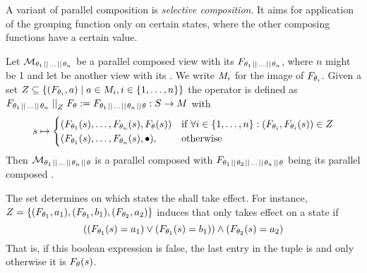 \documentclass[preview]{standalone}
\begin{document}
A variant of parallel composition is \emph{selective composition}. It aims for application of the grouping function only on certain states, where the other composing functions have a certain value.



\begin{definition}
	Let $\view[\viewppty_1 \pll \dots \pll 
	\viewppty_n]$ be a parallel composed view with its \grpfctN $\grpfct[{\viewppty_1 \pll \dots \pll \viewppty_n}]$, where $n$ might be 1 and let \view be another view with its \grpfctN \grpfct. We write $\imggrp_i$ for the image of $\grpfct[\viewppty_i]$.
	Given a set $\compselectset \subseteq \{ (\grpfct[\viewppty_i], a) \mid a \in \imggrp_i, i \in \{1, \dots, n\}\}$ the operator \compselectpure is defined as $\grpfct[{\viewppty_1 \pll \dots \pll \viewppty_n}] \compselect \grpfct := \grpfct[{\viewppty_1 \pll \dots \pll \viewppty_n} \pll \viewppty]: \states \to \arbset$ with
	\[
	\state \mapsto
	\begin{cases}
		(\grpfct[\viewppty_1](\state), \dots, \grpfct[\viewppty_n](\state),  \grpfct[\viewppty](\state))				& \text{if } \forall i \in \{1, \dots, n\} : (\grpfct[\viewppty_i], \grpfct[\viewppty_i](\state)) \in \compselectset \\ 		
		(\grpfct[\viewppty_1](\state), \dots, \grpfct[\viewppty_n](\state),  \remelem),          	& \text{otherwise}
	\end{cases}
	\]
\noindent
Then $\view[\viewppty_1 \pll \dots \pll 
\viewppty_n \pll \viewppty]$ is a parallel composed \viewN with $\grpfct[{\viewppty_1 \pll \viewppty_2 \pll \dots \pll \viewppty_n} \pll \viewppty]$ being its parallel composed \grpfctN.
\end{definition}
The set \compselectset determines on which states the \viewN \view shall take effect. For instance, $\compselectset = \{(\grpfct[\viewppty_1], a_1),(\grpfct[\viewppty_1], b_1), (\grpfct[\viewppty_2], a_2)\}$ induces that \view only takes effect on a state \state if 
\[
((\grpfct[\viewppty_1](\state) = a_1) \lor (\grpfct[\viewppty_1](\state) = b_1)) \land (\grpfct[\viewppty_2](\state) = a_2)
\]
That is, if this boolean expression is false, the last entry in the tuple is \remelem and only otherwise it is $\grpfct(\state)$.
\end{document}
